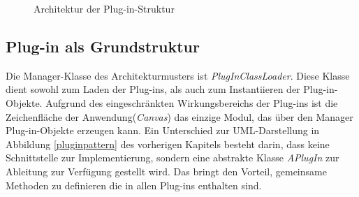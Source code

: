 
\begin{figure}[htbp]
  \vspace{0.5cm}
  \centering
  \caption{Architektur der Plug-in-Struktur}
  \label{aplugin}
  \vspace{0.5cm}
\end{figure}

\FloatBarrier
\subsection{Plug-in als Grundstruktur}
Die Manager-Klasse des Architekturmusters ist \textit{PlugInClassLoader}. Diese Klasse dient sowohl zum Laden der Plug-ins, als auch zum Instantiieren der Plug-in-Objekte. Aufgrund des eingeschränkten Wirkungsbereichs der Plug-ins ist die Zeichenfläche der Anwendung(\textit{Canvas}) das einzige Modul, das über den Manager Plug-in-Objekte erzeugen kann.
Ein Unterschied zur UML-Darstellung in Abbildung \ref{pluginpattern} des vorherigen Kapitels besteht darin, dass keine Schnittstelle zur Implementierung, sondern eine abstrakte Klasse \textit{APlugIn} zur Ableitung zur Verfügung gestellt wird. Das bringt den Vorteil, gemeinsame Methoden zu definieren die in allen Plug-ins enthalten sind.

\FloatBarrier
